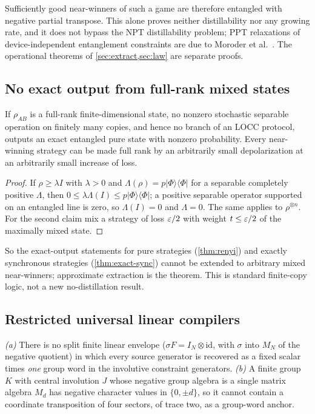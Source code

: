 Sufficiently good near-winners of such a game are therefore entangled with negative partial transpose. This alone proves
neither distillability nor any growing rate, and it does not bypass the NPT distillability problem; PPT relaxations of
device-independent entanglement constraints are due to Moroder et al.~\cite{MBLHG13}. The operational theorems of
\cref{sec:extract,sec:law} are separate proofs.

\subsection{No exact output from full-rank mixed states}\label{sec:no-exact}

\begin{remark}\label{thm:no-exact}
If $\rho_{AB}$ is a full-rank finite-dimensional state, no nonzero stochastic separable operation on finitely many copies, and
hence no branch of an LOCC protocol, outputs an exact entangled pure state with nonzero probability. Every near-winning strategy
can be made full rank by an arbitrarily small depolarization at an arbitrarily small increase of loss.
\end{remark}

\begin{proof}
If $\rho\ge\lambda I$ with $\lambda>0$ and $\Lambda(\rho)=p|\Phi\rangle\langle\Phi|$ for a separable completely positive $\Lambda$, then
$0\le\lambda\Lambda(I)\le p|\Phi\rangle\langle\Phi|$; a positive separable operator supported on an entangled line is zero, so $\Lambda(I)=0$
and $\Lambda=0$. The same applies to $\rho^{\otimes n}$. For the second claim mix a strategy of loss $\varepsilon/2$ with weight $t\le\varepsilon/2$ of
the maximally mixed state.
\end{proof}

So the exact-output statements for pure strategies (\cref{thm:renyi}) and exactly synchronous strategies (\cref{thm:exact-sync})
cannot be extended to arbitrary mixed near-winners; approximate extraction is the theorem. This is standard finite-copy logic,
not a new no-distillation result.

\subsection{Restricted universal linear compilers}\label{sec:no-linear}

\begin{proposition}\label{prop:no-linear}
\emph{(a)} There is no split finite linear envelope ($\sigma F=I_N\otimes\mathrm{id}$, with $\sigma$ into $M_N$ of the negative quotient)
in which every source generator is recovered as a fixed scalar times \emph{one} group word in the involutive constraint
generators. \emph{(b)} A finite group $K$ with central involution $J$ whose negative group algebra is a single matrix algebra $M_d$ has
negative character values in $\{0,\pm d\}$, so it cannot contain a coordinate transposition of four sectors, of trace two, as a
group-word anchor.
\end{proposition}

